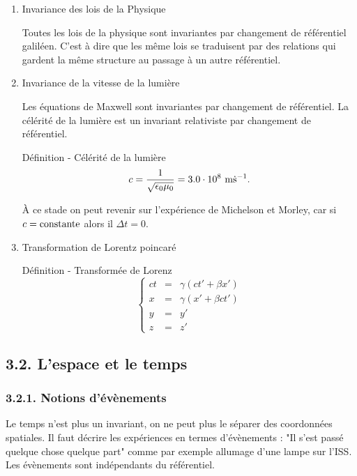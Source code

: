 \documentclass[french, a4paper, 10pt, twocolumn, landscape]{article}
\begin{document}
\begin{enumerate}
	\item Invariance des lois de la Physique
	
Toutes les lois de la physique sont invariantes par changement de référentiel galiléen. C'est à dire que les même lois se traduisent par des relations qui gardent la même structure au passage à un autre référentiel.
	\item Invariance de la vitesse de la lumière
	
Les équations de Maxwell sont invariantes par changement de référentiel. La célérité de la lumière est un invariant relativiste par changement de référentiel.

\begin{definition}{Définition - Célérité de la lumière}
	\begin{equation}
		c = \dfrac{1}{\sqrt{\epsilon_0\mu_0}}=3.0\cdot 10^8~\rm m\dot s^{-1}.
	\end{equation}
\end{definition}

À ce stade on peut revenir sur l'expérience de Michelson et Morley, car si $c=\rm constante$ alors il $\Delta t = 0$.

	\item Transformation de Lorentz poincaré
\begin{definition}{Définition - Transformée de Lorenz}
	\begin{equation}
		\left\{\begin{array}{rcl}
			ct &=& \gamma\left(ct'+\beta x'\right)\\
			x &=& \gamma\left(x'+\beta ct'\right)\\
			y &=& y'\\
			z &=& z'
		\end{array}\right.
	\end{equation}
\end{definition}	
\end{enumerate}

\subsection*{3.2. L'espace et le temps}


\subsubsection*{3.2.1. Notions d'évènements}

Le temps n'est plus un invariant, on ne peut plus le séparer des coordonnées spatiales. Il faut décrire les expériences en termes d'évènements : "Il s'est passé quelque chose quelque part" comme par exemple allumage d'une lampe sur l'ISS. Les évènements sont indépendants du référentiel.
\end{document}
